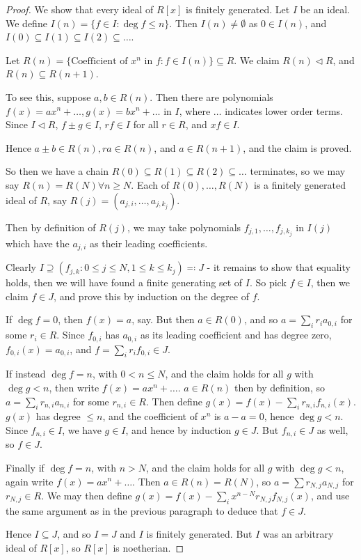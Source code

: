 \documentclass[10pt,a4paper]{article}
\begin{document}
\begin{proof}
  We show that every ideal of $R[x]$ is finitely generated. Let $I$ be an ideal. We define $I(n) = \{f \in I: \deg f \leq n\}$. Then $I(n) \neq \emptyset$ as $0 \in I(n)$, and $I(0) \subseteq I(1) \subseteq I(2) \subseteq \ldots$.

  Let $R(n) = \{\text{Coefficient of $x^n$ in $f$} : f \in I(n)\} \subseteq R$. We claim $R(n) \triangleleft R$, and $R(n) \subseteq R(n+1)$.

  To see this, suppose $a, b \in R(n)$. Then there are polynomials $f(x) = ax^n + \ldots, g(x) = bx^n + \ldots$ in $I$, where $\ldots$ indicates lower order terms. Since $I \triangleleft R$, $f\pm g \in I$, $rf \in I$ for all $r \in R$, and $xf \in I$.

  Hence $a \pm b \in R(n), ra \in R(n)$, and $a \in R(n+1)$, and the claim is proved.

  So then we have a chain $R(0) \subseteq R(1) \subseteq R(2) \subseteq \ldots$ terminates, so we may say $R(n) = R(N)\forall n \geq N$. Each of $R(0), \ldots, R(N)$ is a finitely generated ideal of $R$, say $R(j) = (a_{j,i}, \ldots, a_{j, k_j})$.

  Then by definition of $R(j)$, we may take polynomials $f_{j,1}, \ldots, f_{j, k_j}$ in $I(j)$ which have the $a_{j,i}$ as their leading coefficients.

  Clearly $I \supseteq (f_{j, k} : 0 \leq j \leq N, 1 \leq k \leq k_j) \eqqcolon J$ - it remains to show that equality holds, then we will have found a finite generating set of $I$. So pick $f \in I$, then we claim $f \in J$, and prove this by induction on the degree of $f$.

  If $\deg f = 0$, then $f(x) = a$, say. But then $a \in R(0)$, and so $a = \sum_i r_i a_{0, i}$ for some $r_i \in R$. Since $f_{0, i}$ has $a_{0, i}$ as its leading coefficient and has degree zero, $f_{0, i}(x) = a_{0, i}$, and $f = \sum_i r_i f_{0,i} \in J$.

  If instead $\deg f = n$, with $0 < n \leq N$, and the claim holds for all $g$ with $\deg g < n$, then write $f(x) = ax^n + \ldots$. $a \in R(n)$ then by definition, so $a= \sum_i r_{n, i} a_{n,i}$ for some $r_{n,i} \in R$.
  Then define $g(x) = f(x) - \sum_i r_{n, i} f_{n, i}(x)$. $g(x)$ has degree $\leq n$, and the coefficient of $x^n$ is $a - a = 0$, hence $\deg g < n$. Since $f_{n, i} \in I$, we have $g \in I$, and hence by induction $g \in J$. But $f_{n, i} \in J$ as well, so $f \in J$.

  Finally if $\deg f = n$, with $n > N$, and the claim holds for all $g$ with $\deg g <n$, again write $f(x) = ax^n + \ldots$. Then $a \in R(n) = R(N)$, so $a = \sum r_{N, j} a_{N,j}$ for $r_{N,j} \in R$. We may then define $g(x) = f(x) - \sum_i x^{n-N} r_{N, j} f_{N, j}(x)$, and use the same argument as in the previous paragraph to deduce that $f \in J$.

  Hence $I \subseteq J$, and so $I = J$ and $I$ is finitely generated. But $I$ was an arbitrary ideal of $R[x]$, so $R[x]$ is noetherian.
\end{proof}
\end{document}
